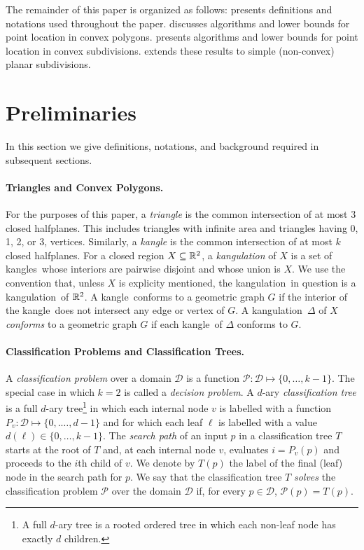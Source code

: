 \documentclass[charterfonts,lotsofwhite]{patmorin}
\newcommand{\kangle}{kangle}
\newcommand{\kangles}{kangles}
\newcommand{\kangulation}{kangulation}
\begin{document}
The remainder of this paper is organized as follows:  
presents definitions and notations used throughout the paper.
 discusses algorithms and lower bounds for point
location in convex polygons.   presents
algorithms and lower bounds for point location in convex subdivisions.
 extends these results to simple (non-convex) planar
subdivisions.


\section{Preliminaries}

In this section we give definitions, notations, and background
required in subsequent sections.

\paragraph{Triangles and Convex Polygons.}  For the purposes of this
paper, a \emph{triangle} is the common intersection of at most 3
closed halfplanes.  This includes triangles with infinite area and
triangles having 0, 1, 2, or 3, vertices. Similarly, a \emph{\kangle}
is the common intersection of at most $k$ closed halfplanes.  For a
closed region $X\subseteq \mathbb{R}^2$, a \emph{\kangulation} of $X$ is a set
of \kangles\ whose interiors are pairwise disjoint and whose union is
$X$.  We use the convention that, unless $X$ is explicity mentioned,
the \kangulation\ in question is a \kangulation\ of $\mathbb{R}^2$.  A
\kangle\ conforms to a geometric graph $G$ if the interior of the
\kangle\ does not intersect any edge or vertex of $G$.  A
\kangulation\ $\Delta$ of $X$ \emph{conforms} to a geometric graph $G$
if each \kangle\ of $\Delta$ conforms to $G$.

\paragraph{Classification Problems and Classification Trees.}

A \emph{classification problem} over a domain $\mathcal{D}$ is a
function $\mathcal{P}:\mathcal{D}\mapsto \{0,\ldots,k-1\}$.  The
special case in which $k=2$ is called a \emph{decision problem}.  A
$d$-ary \emph{classification tree} is a full $d$-ary tree\footnote{A
full $d$-ary tree is a rooted ordered tree in which each non-leaf node
has exactly $d$ children.} in which each internal node $v$ is labelled
with a function $P_v:\mathcal{D}\mapsto\{0,.\ldots,d-1\}$ and for
which each leaf $\ell$ is labelled with a value
$d(\ell)\in\{0,\ldots,k-1\}$. The \emph{search path} of an input $p$
in a classification tree $T$ starts at the root of $T$ and, at each
internal node $v$, evaluates $i=P_v(p)$ and proceeds to the $i$th
child of $v$.  We denote by $T(p)$ the label of the final (leaf) node
in the search path for $p$.  We say that the classification tree $T$
\emph{solves} the classification problem $\mathcal{P}$ over the domain
$\mathcal{D}$ if, for every $p\in \mathcal{D}$, $\mathcal{P}(p)=T(p)$.
\end{document}
